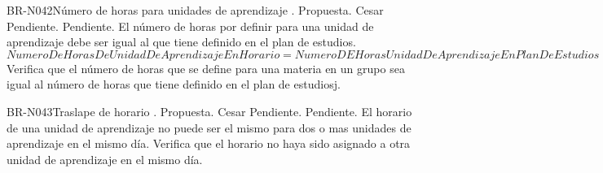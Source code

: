 \begin{BusinessRule}{BR-N042}{Número de horas para unidades de aprendizaje}
	{\bcCondition}    %
	{\btEnabler}     %
	{\blControlling}    %
	.
	\BRItem[Estado] Propuesta.
	 Cesar
	 Pendiente.
	 Pendiente.
	\BRItem[Descripción] El número de horas por definir para una unidad de aprendizaje debe ser igual al que tiene definido en el plan de estudios.
	\BRItem[Sentencia]  $NumeroDeHorasDeUnidadDeAprendizajeEnHorario = NumeroDEHorasUnidadDeAprendizajeEnPlanDeEstudios$
	\BRItem[Motivación] Verifica que el número de horas que se define para una materia en un grupo sea igual al número de horas que tiene definido en el plan de estudiosj.
\end{BusinessRule}

\begin{BusinessRule}{BR-N043}{Traslape de horario}
	{\bcCondition}    %
	{\btEnabler}     %
	{\blControlling}    %
	.
	\BRItem[Estado] Propuesta.
	 Cesar
	 Pendiente.
	 Pendiente.
	\BRItem[Descripción] El horario de una unidad de aprendizaje no puede ser el mismo para dos o mas unidades de aprendizaje en el mismo día.
		\BRItem[Motivación] Verifica que el horario no haya sido asignado a otra unidad de aprendizaje en el mismo día.
\end{BusinessRule}


